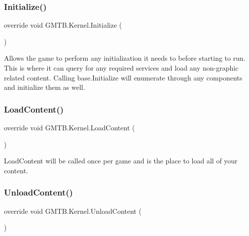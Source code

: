 \subsubsection{\texorpdfstring{Initialize()}{Initialize()}}
{\footnotesize\ttfamily override void G\+M\+T\+B.\+Kernel.\+Initialize (\begin{DoxyParamCaption}{ }\end{DoxyParamCaption})\hspace{0.3cm}{\ttfamily [protected]}}



Allows the game to perform any initialization it needs to before starting to run. This is where it can query for any required services and load any non-\/graphic related content. Calling base.\+Initialize will enumerate through any components and initialize them as well. 

\mbox{\label{class_g_m_t_b_1_1_kernel_a71a7710df9a072c576ca05e3fcf3e8fa}} 
\subsubsection{\texorpdfstring{LoadContent()}{LoadContent()}}
{\footnotesize\ttfamily override void G\+M\+T\+B.\+Kernel.\+Load\+Content (\begin{DoxyParamCaption}{ }\end{DoxyParamCaption})\hspace{0.3cm}{\ttfamily [protected]}}



Load\+Content will be called once per game and is the place to load all of your content. 

\mbox{\label{class_g_m_t_b_1_1_kernel_a8e187a7d6a05fbf9e3b64d980cd6c221}} 
\subsubsection{\texorpdfstring{UnloadContent()}{UnloadContent()}}
{\footnotesize\ttfamily override void G\+M\+T\+B.\+Kernel.\+Unload\+Content (\begin{DoxyParamCaption}{ }\end{DoxyParamCaption})\hspace{0.3cm}{\ttfamily [protected]}}



